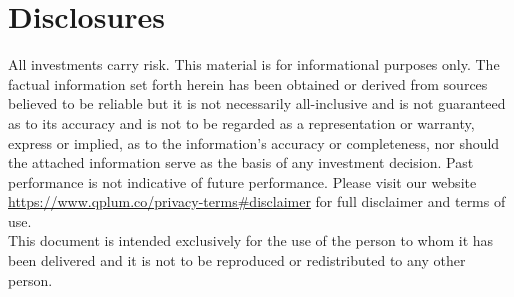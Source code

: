 \documentclass[a4paper]{article}
\begin{document}

\newpage
\section{Disclosures \label{disclosures} }
All investments carry risk. This material is for informational purposes only. The factual information set forth herein has been obtained or derived from sources believed to be reliable but it is not necessarily all-inclusive and is not guaranteed as to its accuracy and is not to be regarded as a representation or warranty, express or implied, as to the information’s accuracy or completeness, nor should the attached information serve as the basis of any investment decision. Past performance is not indicative of future performance. Please visit our website \url{https://www.qplum.co/privacy-terms#disclaimer} for full disclaimer and terms of use.\\
This document is intended exclusively for the use of the person to whom it has been delivered and it is not to be reproduced or redistributed to any other person.
\end{document}
